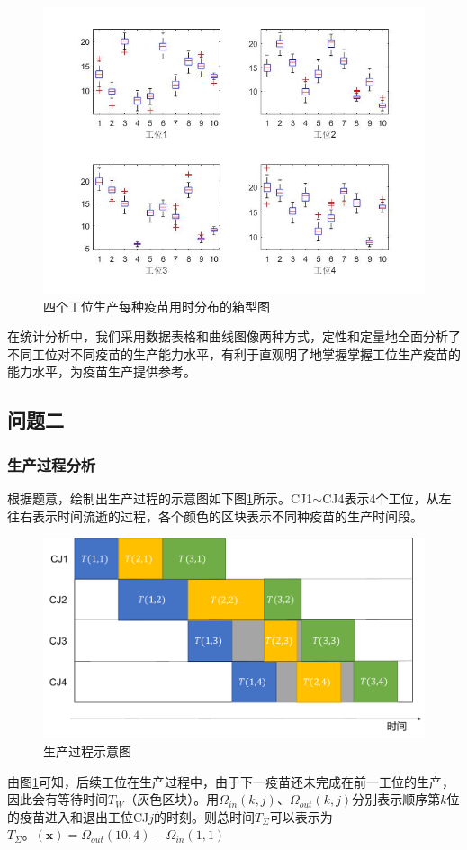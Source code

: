 \documentclass[UTF8]{ctexart}
\begin{document}
	\begin{figure}[H]
		\centering %
		\includegraphics[scale=0.5]{箱型图new.jpg}
		\caption{四个工位生产每种疫苗用时分布的箱型图}
	\end{figure}
	在统计分析中，我们采用数据表格和曲线图像两种方式，定性和定量地全面分析了不同工位对不同疫苗的生产能力水平，有利于直观明了地掌握掌握工位生产疫苗的能力水平，为疫苗生产提供参考。
	
	\subsection{问题二}
	\subsubsection{生产过程分析}
	根据题意，绘制出生产过程的示意图如下图\ref{pipeline1}所示。CJ1$\sim$CJ4表示4个工位，从左往右表示时间流逝的过程，各个颜色的区块表示不同种疫苗的生产时间段。
	\begin{figure}[H]
		\centering %
		\includegraphics[scale=0.5]{pipe1.pdf}
		\caption{生产过程示意图}\label{pipeline1}
	\end{figure}
	由图\ref{pipeline1}可知，后续工位在生产过程中，由于下一疫苗还未完成在前一工位的生产，因此会有等待时间$T_{W}$（灰色区块）。用$\Omega_{in}(k,j)$、$\Omega_{out}(k,j)$分别表示顺序第$k$位的疫苗进入和退出工位CJ$j$的时刻。则总时间$T_{\Sigma}$可以表示为$T_{\Sigma}。(\boldsymbol{x})=\Omega_{out}(10,4)-\Omega_{in}(1,1)$
\end{document}
